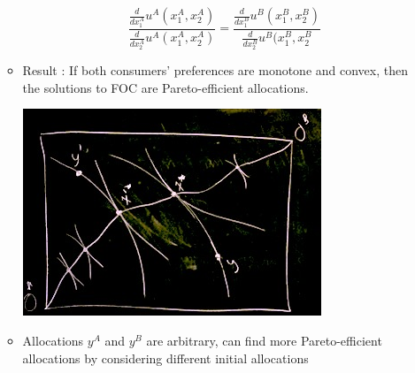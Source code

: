 \documentclass[twoside]{article}
\begin{document}
\begin{itemize}
\begin{itemize}
\[\frac{\frac{d}{dx_1^{A}} u^A(x_1^A, x_2^A)}{\frac{d}{dx_2^A} u^A(x_1^A, x_2^A)} = \frac{\frac{d}{dx_1^B} u^B(x_1^B, x_2^B)}{\frac{d}{dx_2^B} u^B(x_1^B, x_2^B}\]
\item Result : If both consumers' preferences are monotone and convex, then the solutions to FOC are Pareto-efficient allocations. 
\begin{center}
\includegraphics[scale=0.4]{23}
\end{center}
\item Allocations \(y^A\) and \(y^B\) are arbitrary, can find more Pareto-efficient allocations by considering different initial allocations 
\end{itemize}
\end{itemize}
\end{document}
